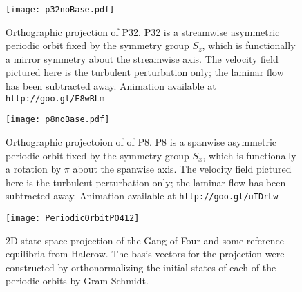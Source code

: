 \begin{figure}
\centerline{\texttt{[image: p32noBase.pdf]}}
\caption{Orthographic projection of P32. P32 is a streamwise asymmetric periodic orbit fixed by the symmetry group $S_z$, which is functionally a mirror symmetry about the streamwise axis. The velocity field pictured here is the turbulent perturbation only; the laminar flow has been subtracted away. Animation available at {\tt http://goo.gl/E8wRLm}}\label{fig:p32}
\end{figure}


\begin{figure}
\centerline{\texttt{[image: p8noBase.pdf]}}
\caption{Orthographic projectoion of  of P8. P8 is a spanwise asymmetric periodic orbit fixed by the symmetry group $S_x$, which is functionally a rotation by $\pi$ about the spanwise axis. The velocity field pictured here is the turbulent perturbation only; the laminar flow has been subtracted away. Animation available at {\tt http://goo.gl/uTDrLw}}\label{fig:p8}
\end{figure}



\begin{figure}[h]
\texttt{[image: PeriodicOrbitPO412]}
\caption{2D state space projection of the Gang of Four and some reference equilibria from Halcrow. The basis vectors for the projection were constructed by orthonormalizing the initial states of each of the periodic orbits by Gram-Schmidt.}\label{fig:POStateSpace}
\end{figure}

